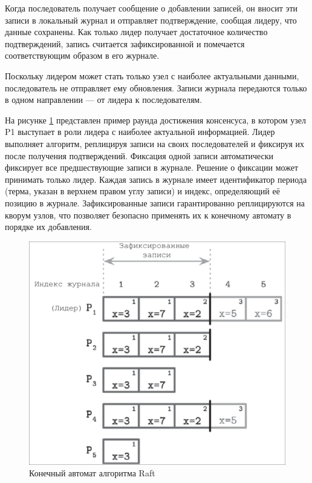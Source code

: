 Когда последователь получает сообщение о добавлении записей, он вносит эти
записи в локальный журнал и отправляет подтверждение, сообщая лидеру, что данные
сохранены. Как только лидер получает достаточное количество подтверждений, запись
считается зафиксированной и помечается соответствующим образом в его журнале.

Поскольку лидером может стать только узел с наиболее актуальными данными,
последователь не отправляет ему обновления. Записи журнала передаются
только в одном направлении — от лидера к последователям.

На рисунке \ref{fig:raft-consensus} представлен пример раунда достижения
консенсуса, в котором узел P1 выступает в роли лидера с наиболее актуальной
информацией. Лидер выполняет алгоритм, реплицируя записи на своих последователей
и фиксируя их после получения подтверждений. Фиксация одной записи автоматически
фиксирует все предшествующие записи в журнале. Решение о фиксации может принимать
только лидер. Каждая запись в журнале имеет идентификатор периода (терма, указан в
верхнем правом углу записи) и индекс, определяющий её позицию в журнале.
Зафиксированные записи гарантированно реплицируются на кворум узлов, что
позволяет безопасно применять их к конечному автомату в порядке их добавления.

\begin{figure}
  \centering
  \includegraphics[scale=0.4]{inc/raft-consensus.png}
  \caption{Конечный автомат алгоритма Raft}
  \label{fig:raft-consensus}
\end{figure}

